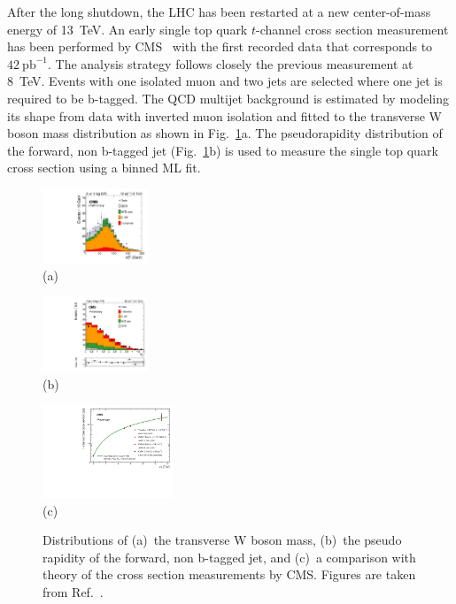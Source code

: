 \documentclass{PoS}
\begin{document}
After the long shutdown, the LHC has been restarted at a new center-of-mass energy of 13~TeV. An early single top quark $t$-channel cross section measurement has been performed by CMS~\cite{CMS-PAS-TOP-15-004} with the first recorded data that corresponds to $42~\mathrm{pb}^{-1}$.
The analysis strategy follows closely the previous measurement at 8~TeV. Events with one isolated muon and two jets are selected where one jet is required to be b-tagged. The QCD multijet background is estimated by modeling its shape from data with inverted muon isolation and fitted to the transverse W boson mass distribution as shown in Fig.~\ref{fig:singletop13}a. The pseudorapidity distribution of the forward, non b-tagged jet (Fig.~\ref{fig:singletop13}b) is used to measure the single top quark cross section using a binned ML fit.
\begin{figure}[htbp]
\begin{center}
\parbox[t]{0.29\textwidth}{\centering\includegraphics[width=0.28\textwidth]{cms_xsec13/mtw.pdf}\\(a)}
\parbox[t]{0.29\textwidth}{\centering\includegraphics[width=0.28\textwidth]{cms_xsec13/mu2j1t.pdf}\\(b)}
\parbox[t]{0.39\textwidth}{\centering\includegraphics[width=0.35\textwidth]{cms_xsec13/xsec.pdf}\\(c)}
\end{center}
\caption{\label{fig:singletop13}Distributions of (a)~the transverse W boson mass, (b)~the pseudo rapidity of the forward, non b-tagged jet, and (c)~a comparison with theory of the cross section measurements by CMS. Figures are taken from Ref.~\cite{CMS-PAS-TOP-15-004}.}
\end{figure}
\end{document}
